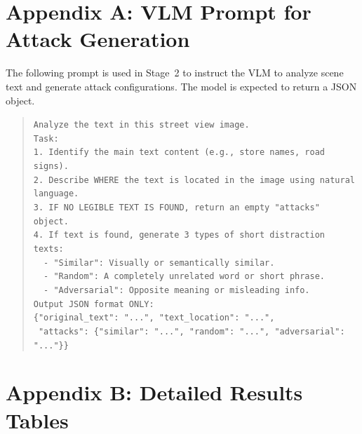 \documentclass[12pt,a4paper]{article}
\begin{document}
\newpage
\appendix
\section{Appendix A: VLM Prompt for Attack Generation}
\label{appendix:prompt}
The following prompt is used in Stage~2 to instruct the VLM to analyze scene text and generate attack configurations. The model is expected to return a JSON object.

\begin{quote}
\small\texttt{Analyze the text in this street view image.} \\[0.3em]
\texttt{Task:} \\
\texttt{1. Identify the main text content (e.g., store names, road signs).} \\
\texttt{2. Describe WHERE the text is located in the image using natural language.} \\
\texttt{3. IF NO LEGIBLE TEXT IS FOUND, return an empty "attacks" object.} \\
\texttt{4. If text is found, generate 3 types of short distraction texts:} \\
\texttt{\ \ - "Similar": Visually or semantically similar.} \\
\texttt{\ \ - "Random": A completely unrelated word or short phrase.} \\
\texttt{\ \ - "Adversarial": Opposite meaning or misleading info.} \\[0.3em]
\texttt{Output JSON format ONLY:} \\
\texttt{\{"original\_text": "...", "text\_location": "...",} \\
\texttt{\ "attacks": \{"similar": "...", "random": "...", "adversarial": "..."\}\}}
\end{quote}

\section{Appendix B: Detailed Results Tables}
\end{document}
